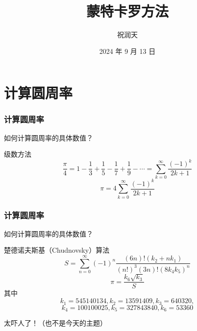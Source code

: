 \documentclass{beamer}
\title{蒙特卡罗方法}
\author{祝润天}
\institute{复旦大学计算机科学技术学院}
\date{2024 年 9 月 13 日}
\begin{document}
\begin{frame}
    
    \maketitle

\end{frame}

\section{计算圆周率}

\begin{frame}
    \frametitle{计算圆周率}

    \begin{problem}
        如何计算圆周率的具体数值？       
    \end{problem}

    \pause

    \begin{block}{级数方法}
        $$\frac{\pi}{4} = 1 - \frac{1}{3} + \frac{1}{5} - \frac{1}{7} + \frac{1}{9} - \cdots = \sum_{k = 0}^{\infty} \frac{(-1)^k}{2k + 1}$$
        $$\pi = 4\sum_{k = 0}^{\infty} \frac{(-1)^k}{2k + 1}$$
    \end{block}

\end{frame}

\begin{frame}
    \frametitle{计算圆周率}

    \begin{problem}
        如何计算圆周率的具体数值？       
    \end{problem}

    \begin{block}{楚德诺夫斯基（Chudnovsky）算法}
        $$S = \sum_{n = 0}^{\infty} (-1)^n \frac{(6n)!(k_2+nk_1)}{(n!)^3(3n)!(8k_4k_5)^n}$$
        $$\pi = \frac{k_6\sqrt{k_3}}{S}$$
        其中
        $$k_1 = 545140134, k_2 = 13591409, k_3 = 640320,$$
        $$k_4 = 100100025, k_5 = 327843840, k_6 = 53360$$
    \end{block}
    太吓人了！（也不是今天的主题）

\end{frame}
\end{document}
